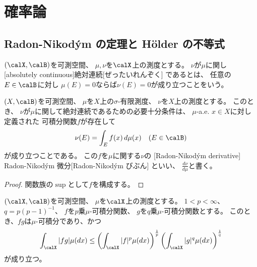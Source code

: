 \documentclass[report]{jlreq}
\begin{document}
\tableofcontents
\markboth{\contentsname}{}

%
\chapter{確率論}

%
\section{Radon-Nikod\'ym の定理と H\"older の不等式}


\begin{definition}[絶対連続]
    $(\calX, \calB)$を可測空間、
    $\mu, \nu$を$\calX$上の測度とする。
    $\nu$が$\mu$に関し
    [absolutely continuous]{絶対連続}[ぜったいれんぞく]
    であるとは、
    任意の$E \in \calB$に対し
    $\mu(E) = 0$ならば$\nu(E) = 0$が成り立つことをいう。
\end{definition}

\begin{theorem}
    $(X, \calB)$を可測空間、
    $\mu$を$X$上の$\sigma$-有限測度、
    $\nu$を$X$上の測度とする。
    このとき、
    $\nu$が$\mu$に関して絶対連続であるための必要十分条件は、
    $\mu$-a.e. $x \in X$に対し定義された
    可積分関数$f$が存在して
    \begin{equation}
        \nu(E) = \int_E f(x) \, d\mu(x)
            \quad
            (E \in \calB)
    \end{equation}
    が成り立つことである。
    この$f$を$\mu$に関する$\nu$の
    [Radon-Nikod\'ym derivative]
        {Radon-Nikod\'ym 微分}[Radon-Nikod\'ym びぶん]
    といい、
    $\frac{d\nu}{d\mu}$と書く。
\end{theorem}

\begin{proof}
    関数族の$\sup$として$f$を構成する。
\end{proof}

\begin{proposition}
    $(\calX, \calB)$を可測空間、
    $\mu$を$\calX$上の測度とする。
    $1 < p < \infty$、$q = p(p - 1)^{-1}$、
    $f$を$p$乗$\mu$-可積分関数、
    $g$を$q$乗$\mu$-可積分関数とする。
    このとき、$fg$は$\mu$-可積分であり、かつ
    \begin{equation}
        \int_\calX |fg| \mu(dx)
            \le \myparen{
                \int_\calX |f|^{p} \mu(dx)
            }^{\frac{1}{p}}
            \myparen{
                \int_\calX |g|^{q} \mu(dx)
            }^{\frac{1}{q}}
    \end{equation}
    が成り立つ。
\end{proposition}
\end{document}
